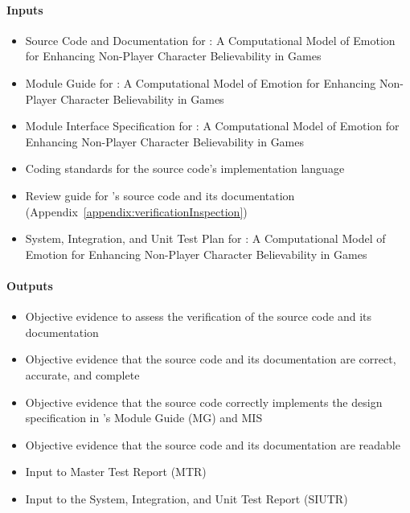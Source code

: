 \paragraph{Inputs}
\begin{itemize}

    \item Source Code and Documentation for \progname{}: A Computational Model
    of Emotion for Enhancing Non-Player Character Believability in Games

    \item Module Guide for \progname{}: A Computational Model of Emotion for
    Enhancing Non-Player Character Believability in Games

    \item Module Interface Specification for \progname{}: A Computational Model
    of Emotion for Enhancing Non-Player Character Believability in Games

    \item Coding standards for the source code's implementation language

    \item Review guide for \progname{}'s source code and its documentation
    (Appendix~\ref{appendix:verificationInspection})

    \item System, Integration, and Unit Test Plan for \progname{}: A
    Computational Model of Emotion for Enhancing Non-Player Character
    Believability in Games

\end{itemize}

\paragraph{Outputs}
\begin{itemize}

    \item Objective evidence to assess the verification of the source code and
    its documentation

    \item Objective evidence that the source code and its documentation are
    correct, accurate, and complete

    \item Objective evidence that the source code correctly implements the
    design specification in \progname{}'s Module Guide (MG) and MIS

    \item Objective evidence that the source code and its documentation are
    readable

    \item Input to Master Test Report (MTR)

    \item Input to the System, Integration, and Unit Test Report (SIUTR)

\end{itemize}

